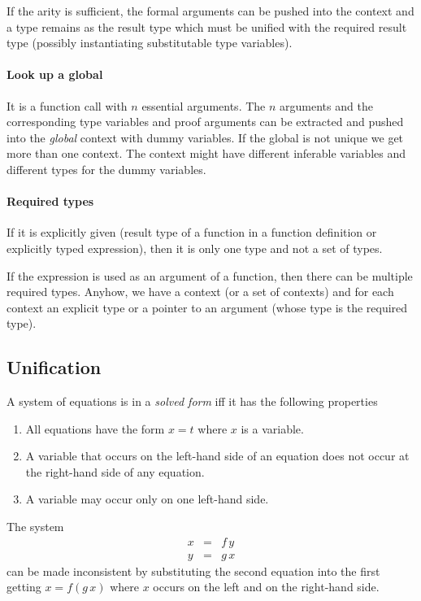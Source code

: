 If the arity is sufficient, the formal arguments can be pushed into the
context and a type remains as the result type which must be unified with the
required result type (possibly instantiating substitutable type variables).


\paragraph{Look up a global} It is a function call with $n$ essential
arguments. The $n$ arguments and the corresponding type variables and proof
arguments can be extracted and pushed into the \emph{global} context with
dummy variables. If the global is not unique we get more than one context. The
context might have different inferable variables and different types for the
dummy variables.

\paragraph{Required types}
If it is explicitly given (result type of a function in a function definition
or explicitly typed expression), then it is only one type and not a set of
types.

If the expression is used as an argument of a function, then there can be
multiple required types. Anyhow, we have a context (or a set of contexts) and
for each context an explicit type or a pointer to an argument (whose type is
the required type).




\subsection{Unification}


A system of equations is in a \emph{solved form} iff it has the following
properties
%
\begin{enumerate}

\item All equations have the form $x = t$ where $x$ is a variable.

\item A variable that occurs on the left-hand side of an equation does not
  occur at the right-hand side of any equation.

\item A variable may occur only on one left-hand side.
\end{enumerate}

The system
$$
%
\begin{array}{lll}
  x &=& f\, y
  \\
  y &=& g\, x
\end{array}
$$
%
can be made inconsistent by substituting the second equation into the first
getting $x = f (g\, x)$ where $x$ occurs on the left and on the right-hand side.

